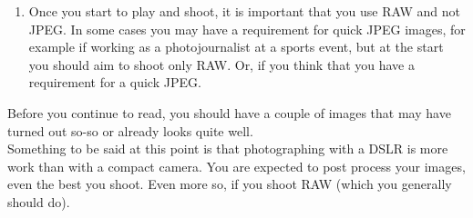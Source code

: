 \begin{enumerate}[i]
	\item Once you start to play and shoot, it is important that you use \gls{RAW} and not \gls{JPEG}. In some cases you may have a requirement for quick \gls{JPEG} images, for example if working as a \gls{photojournalist} at a sports event, but at the start you should aim to shoot only \gls{RAW}. Or, if you think that you have a requirement for a quick \gls{JPEG}.
\end{enumerate}

Before you continue to read, you should have a couple of images that may have turned out so-so or already looks quite well.
\\
Something to be said at this point is that photographing with a \gls{DSLR} is more work than with a compact camera. You are expected to post process your images, even the best you shoot. Even more so, if you shoot \gls{RAW} (which you generally should do).